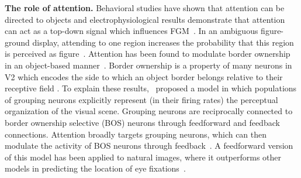 \documentclass[11pt,notitlepage]{article}
\begin{document}
\textbf{The role of attention.}  Behavioral studies have shown that
attention can be directed to objects \citep{Egly_etal94} and
electrophysiological results demonstrate that attention can act as a
top-down signal which influences FGM~\citep{Qiu_etal07,
  Poort_etal12}. In an ambiguous figure-ground display, attending to
one region increases the probability that this region is perceived as
figure~\citep{Driver_Baylis96, Vecera_etal04}.
%
Attention has been found to modulate border ownership in an object-based manner~\citep{Qiu_etal07}.
Border ownership is a property of many
    neurons in V2 which encodes the side to which an object border
    belongs 
relative to their receptive field
    \citep{Zhou_etal00}. To explain these
results,~\citet{Craft_etal07} proposed a model in which populations of
grouping neurons explicitly represent (in their firing rates) the
perceptual organization of the visual scene. Grouping neurons are
reciprocally connected to border ownership selective (BOS) neurons
through feedforward and feedback connections. Attention broadly
targets grouping neurons, which can then modulate the activity of BOS
neurons through
feedback~\citep{Mihalas_etal11b}. 
A feedforward version of this model has been
    applied to natural images, where it outperforms other
models in predicting the location of eye
fixations~\citep{Russell_etal14}.
\end{document}
